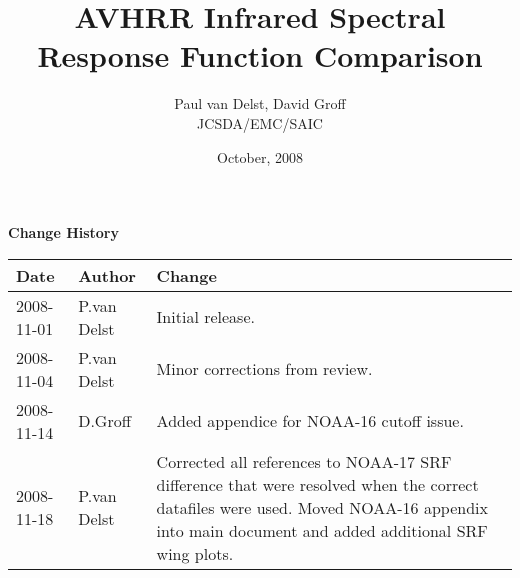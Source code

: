 



\title{AVHRR Infrared Spectral Response Function Comparison}
\author{Paul van Delst, David Groff\\JCSDA/EMC/SAIC}
\date{October, 2008}



\maketitle


\thispagestyle{empty}
\vspace*{10cm}
\begin{center}
  {\sffamily\Large\bfseries Change History}
  \begin{table}[htp]
    \centering
    \begin{tabular}{|p{2cm}|p{3cm}|p{8cm}|}
      \hline
      \sffamily\textbf{Date} & \sffamily\textbf{Author} & \sffamily\textbf{Change}\\
      \hline\hline
      2008-11-01 & P.van Delst & Initial release.\\
      \hline
      2008-11-04 & P.van Delst & Minor corrections from review.\\
      \hline
      2008-11-14 & D.Groff & Added appendice for NOAA-16 cutoff issue.\\
      \hline
      2008-11-18 & P.van Delst & Corrected all references to NOAA-17 SRF difference that were resolved when the correct datafiles were used. Moved NOAA-16 appendix into main document and added additional SRF wing plots.\\
      \hline
    \end{tabular}
  \end{table}
\end{center}
\clearpage
{}
\setcounter{page}{1}









\clearpage




\begin{appendix}
  
  
\end{appendix}



